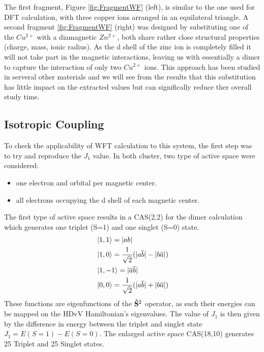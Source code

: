 \documentclass[12pt]{report}
\numberwithin{equation}{section}
\begin{document}
The first fragment, Figure \ref{fig:FragmentWF} (left), is similar to the one used for DFT calculation, with three copper ions arranged in an equilateral triangle. 
A second fragment \ref{fig:FragmentWF} (right) was designed by substituting one of the $Cu^{2+}$ with a diamagnetic $Zn^{2+}$, both share rather close structural properties (charge, mass, ionic radius).
As the d shell of the zinc ion is completely filled it will not take part in the magnetic interactions, leaving us with essentially a dimer to capture the interaction of only two $Cu^{2+}$ ions. 
This approach has been studied in serveral other materials and we will see from the results that this substitution has little impact on the extracted values but can significally reduce ther overall study time.

\subsection{Isotropic Coupling}

To check the applicability of WFT calculation to this system, the first step was to try and reproduce the $J_1$ value.
In both cluster, two type of active space were considered:
\begin{itemize}
    \item one electron and orbital per magnetic center.
    \item all electrons occupying the d shell of each magnetic center.
\end{itemize}

\noindent The first type of active space results in a CAS(2,2) for the dimer calculation which generates one triplet (S=1) and one singlet (S=0) state.
\begin{align}
    &\ket{1,1}=|ab|\\
    &\ket{1,0}=\frac{1}{\sqrt{2}}(|a\overline{b}|-|b\overline{a}|)\\
    &\ket{1,-1}=|\overline{a}\overline{b}|\\
    &\ket{0,0}=\frac{1}{\sqrt{2}}(|a\overline{b}|+|b\overline{a}|)
\end{align}
These functions are eigenfunctions of the $\vb{\hat{S}}^2$ operator, as such their energies can be mapped on the HDvV Hamiltonian's eigenvalues.
The value of $J_1$ is then given by the difference in energy between the triplet and singlet state $J_1=E(S=1)-E(S=0)$.
The enlarged active space CAS(18,10) generates 25 Triplet and 25 Singlet states.
\end{document}
